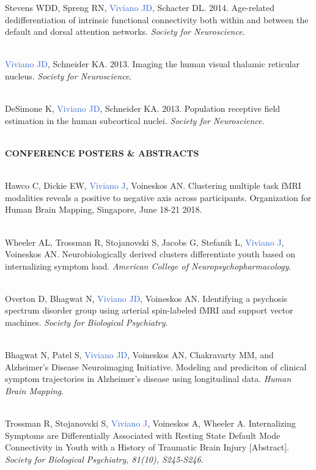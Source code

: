 \documentclass[a4paper,11pt,oneside]{book}
\newcommand\sectionheading{
    \normalsize
    \noindent
    \leftskip=0in
    \textbf
}
\begin{document}
\begin{flushleft}
Stevens WDD, Spreng RN, \textcolor{highlight}{Viviano JD}, Schacter DL. 2014. Age-related dedifferentiation of intrinsic functional connectivity both within and between the default and dorsal attention networks. \textit{Society for Neuroscience}. \\\

\textcolor{highlight}{Viviano JD}, Schneider KA. 2013. Imaging the human visual thalamic reticular nucleus. \textit{Society for Neuroscience}. \\\

DeSimone K, \textcolor{highlight}{Viviano JD}, Schneider KA. 2013. Population receptive field estimation in the human subcortical nuclei. \textit{Society for Neuroscience}. \\\

\sectionheading{CONFERENCE POSTERS \& ABSTRACTS} \\\

Hawco C, Dickie EW, \textcolor{highlight}{Viviano J}, Voineskos AN. Clustering multiple task fMRI modalities reveals a positive to negative axis across participants. Organization for Human Brain Mapping, Singapore, June 18-21 2018. \\\

Wheeler AL, Trossman R, Stojanovski S, Jacobs G, Stefanik L, \textcolor{highlight}{Viviano J}, Voineskos AN. Neurobiologically derived clusters differentiate youth based on internalizing symptom load. \textit{American College of Neuropsychopharmacology}. \\\

Overton D, Bhagwat N, \textcolor{highlight}{Viviano JD}, Voineskos AN. Identifying a psychosis spectrum disorder group using arterial spin-labeled fMRI and support vector machines. \textit{Society for Biological Psychiatry}. \\\

Bhagwat N, Patel S, \textcolor{highlight}{Viviano JD}, Voineskos AN, Chakravarty MM, and Alzheimer's Disease Neuroimaging Initiative. Modeling and prediciton of clinical symptom trajectories in Alzheimer's disease using longitudinal data. \textit{Human Brain Mapping}. \\\

Trossman R, Stojanovski S, \textcolor{highlight}{Viviano J}, Voineskos A, Wheeler A. Internalizing Symptoms are Differentially Associated with Resting State Default Mode Connectivity in Youth with a History of Traumatic Brain Injury [Abstract]. \textit{Society for Biological Psychiatry, 81(10), S245-S246}. \\\


\end{flushleft}
\end{document}
